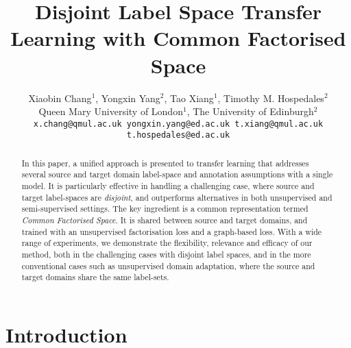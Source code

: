 \documentclass[letterpaper]{article} \usepackage{aaai19}  \usepackage{times}  \usepackage{helvet}  \usepackage{courier}  \usepackage{url}  \usepackage{graphicx}
\begin{document}
\title{Disjoint Label Space Transfer Learning with Common Factorised Space}


\author{Xiaobin Chang$^1$, Yongxin Yang$^2$, Tao Xiang$^1$, Timothy M. Hospedales$^2$\\
Queen Mary University of London$^1$, The University of Edinburgh$^2$\\
{\tt\small x.chang@qmul.ac.uk yongxin.yang@ed.ac.uk t.xiang@qmul.ac.uk t.hospedales@ed.ac.uk}
}


\maketitle
\begin{abstract}
In this paper, a unified approach is presented to transfer learning that addresses several source and target domain label-space and annotation assumptions with a single model. It is particularly effective in handling a challenging case, where source and target label-spaces are \emph{disjoint}, and outperforms alternatives in both unsupervised and semi-supervised settings. The key ingredient is a common representation termed \emph{Common Factorised Space}. It is shared between source and target domains, and trained with an unsupervised factorisation loss and a graph-based loss. 
With a wide range of experiments, we demonstrate the flexibility, relevance and efficacy of our method, both in the challenging cases with disjoint label spaces, and in the more conventional cases such as unsupervised domain adaptation, where the source and target domains share the same label-sets.



\end{abstract}

\section{Introduction}\label{Sec:Into}
\end{document}
